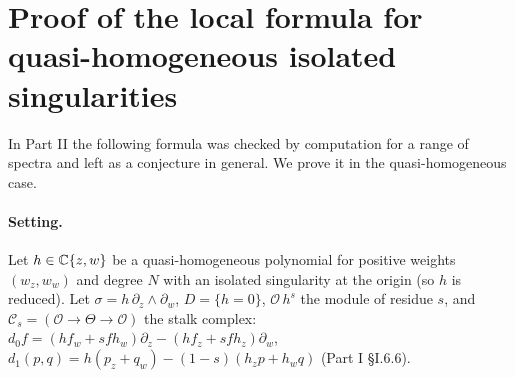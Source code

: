 \section{Proof of the local formula for quasi-homogeneous isolated singularities}\label{p5:sec:local}
In Part II the following formula was checked by computation for a range of spectra and left as a conjecture in general. We prove it in the quasi-homogeneous case.

\paragraph{Setting.} Let $h\in\mathbb C\{z,w\}$ be a quasi-homogeneous polynomial for positive weights $(w_z,w_w)$ and degree $N$ with an isolated singularity at the origin (so $h$ is reduced). Let $\sigma=h\,\partial_z\wedge\partial_w$, $D=\{h=0\}$, $\mathcal O\,h^s$ the module of residue $s$, and $\mathcal C_s=(\mathcal O\to\Theta\to\mathcal O)$ the stalk complex: $d_0f=(hf_w+sfh_w)\partial_z-(hf_z+sfh_z)\partial_w$, $d_1(p,q)=h(p_z+q_w)-(1-s)(h_zp+h_wq)$ (Part I \S I.6.6).

